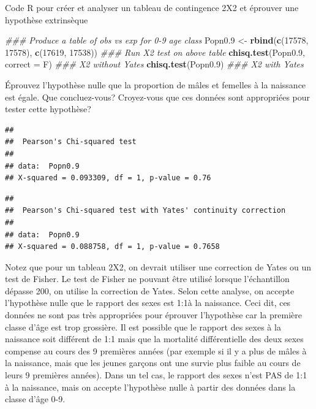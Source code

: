 \documentclass[
  12pt,
]{book}
\makeatletter
\newenvironment{Shaded}{\begin{snugshade}}{\end{snugshade}}
\newcommand{\CommentTok}[1]{\textcolor[rgb]{0.56,0.35,0.01}{\textit{#1}}}
\newcommand{\DataTypeTok}[1]{\textcolor[rgb]{0.13,0.29,0.53}{#1}}
\newcommand{\DecValTok}[1]{\textcolor[rgb]{0.00,0.00,0.81}{#1}}
\newcommand{\FloatTok}[1]{\textcolor[rgb]{0.00,0.00,0.81}{#1}}
\newcommand{\KeywordTok}[1]{\textcolor[rgb]{0.13,0.29,0.53}{\textbf{#1}}}
\newcommand{\NormalTok}[1]{#1}
\newcommand{\StringTok}[1]{\textcolor[rgb]{0.31,0.60,0.02}{#1}}
\newenvironment{kframe}{%
\medskip{}
\setlength{\fboxsep}{.8em}
\def\at@end@of@kframe{}%
\ifinner\ifhmode%
 \def\at@end@of@kframe{\end{minipage}}%
 \begin{minipage}{\columnwidth}%
\fi\fi%
\def\FrameCommand##1{\hskip\@totalleftmargin \hskip-\fboxsep
\colorbox{incolor}{##1}\hskip-\fboxsep
    \hskip-\linewidth \hskip-\@totalleftmargin \hskip\columnwidth}%
\MakeFramed {\advance\hsize-\width
  \@totalleftmargin\z@ \linewidth\hsize
  \@setminipage}}%
{\par\unskip\endMakeFramed%
\at@end@of@kframe}
\newenvironment{rmdblock}[1]
 {
 \begin{itemize}
 \renewcommand{\labelitemi}{
   \raisebox{-.7\height}[0pt][0pt]{
     {\setkeys{Gin}{width=3em,keepaspectratio}\texttt{[image: images/\#1]}}
   }
 }
 \begin{kframe}
 \setlength{\fboxsep}{1em}
 \item
 }
 {
 \end{kframe}
 \end{itemize}
 }
\newenvironment{rmdcode}
  {\begin{rmdblock}{screen}}
  {\end{rmdblock}}
\makeatother
\begin{document}
Code R pour créer et analyser un tableau de contingence 2X2 et éprouver une hypothèse extrinsèque

\begin{Shaded}
\begin{Highlighting}[]
\CommentTok{\#\#\# Produce a table of obs vs exp for 0{-}9 age class}
\NormalTok{Popn0}\FloatTok{.9}\NormalTok{ \textless{}{-}}\StringTok{ }\KeywordTok{rbind}\NormalTok{(}\KeywordTok{c}\NormalTok{(}\DecValTok{17578}\NormalTok{, }\DecValTok{17578}\NormalTok{), }\KeywordTok{c}\NormalTok{(}\DecValTok{17619}\NormalTok{, }\DecValTok{17538}\NormalTok{))}
\CommentTok{\#\#\# Run X2 test on above table}
\KeywordTok{chisq.test}\NormalTok{(Popn0}\FloatTok{.9}\NormalTok{, }\DataTypeTok{correct =}\NormalTok{ F) }\CommentTok{\#\#\# X2 without Yates}
\KeywordTok{chisq.test}\NormalTok{(Popn0}\FloatTok{.9}\NormalTok{) }\CommentTok{\#\#\# X2 with Yates}
\end{Highlighting}
\end{Shaded}

\begin{rmdcode}
Éprouvez l'hypothèse nulle que la proportion de mâles et femelles à la naissance est égale. Que concluez-vous? Croyez-vous que ces données sont appropriées pour tester cette hypothèse?
\end{rmdcode}

\begin{verbatim}
## 
##  Pearson's Chi-squared test
## 
## data:  Popn0.9
## X-squared = 0.093309, df = 1, p-value = 0.76
\end{verbatim}

\begin{verbatim}
## 
##  Pearson's Chi-squared test with Yates' continuity correction
## 
## data:  Popn0.9
## X-squared = 0.088758, df = 1, p-value = 0.7658
\end{verbatim}

Notez que pour un tableau 2X2, on devrait utiliser une correction de Yates ou un test de Fisher. Le test de Fisher ne pouvant être utilisé lorsque l'échantillon dépasse 200, on utilise la correction de Yates. Selon cette analyse, on accepte l'hypothèse nulle que le rapport des sexes est 1:1à la naissance. Ceci dit, ces données ne sont pas très appropriées pour éprouver l'hypothèse car la première classe d'âge est trop grossière. Il est possible que le rapport des sexes à la naissance soit différent de 1:1 mais que la mortalité différentielle des deux sexes compense au cours des 9 premières années (par exemple si il y a plus de mâles à la naissance, mais que les jeunes garçons ont une survie plus faible au cours de leurs 9 premières années). Dans un tel cas, le rapport des sexes n'est PAS de 1:1 à la naissance, mais on accepte l'hypothèse nulle à partir des données dans la classe d'âge 0-9.
\end{document}
